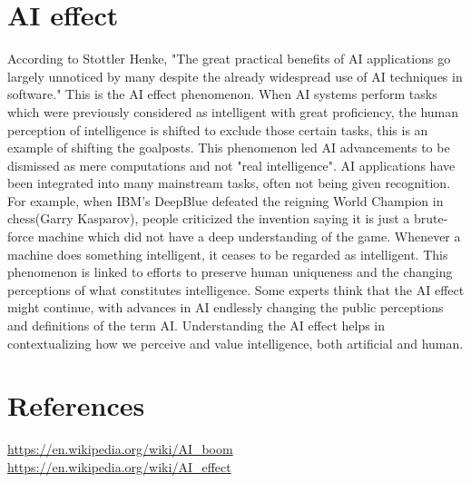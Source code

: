 \documentclass[final]{article}
\begin{document}
\section{AI effect}
According to Stottler Henke, "The great practical benefits of AI applications go largely unnoticed by many despite the already widespread use of AI techniques in software." This is the AI effect phenomenon. When AI systems perform tasks which were previously considered as intelligent with great proficiency, the human perception of intelligence is shifted to exclude those certain tasks, this is an example of shifting the goalposts. This phenomenon led AI advancements to be dismissed as mere computations and not "real intelligence". AI applications have been integrated into many mainstream tasks, often not being given recognition. For example, when IBM's DeepBlue defeated the reigning World Champion in chess(Garry Kasparov), people criticized the invention saying it is just a brute-force machine which did not have a deep understanding of the game. Whenever a machine does something intelligent, it ceases to be regarded as intelligent. This phenomenon is linked to efforts to preserve human uniqueness and the changing perceptions of what constitutes intelligence. Some experts think that the AI effect might continue, with advances in AI endlessly changing the public perceptions and definitions of the term AI. Understanding the AI effect helps in contextualizing how we perceive and value intelligence, both artificial and human. 
\section{References}
\url{https://en.wikipedia.org/wiki/AI_boom} \\
\url{https://en.wikipedia.org/wiki/AI_effect}
\end{document}
